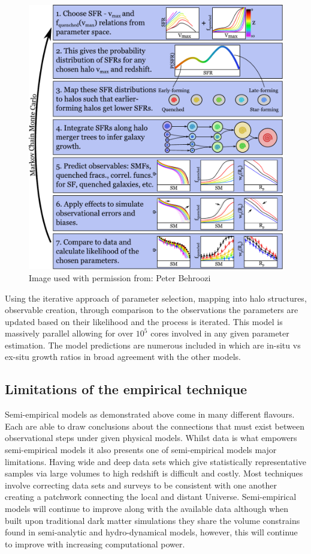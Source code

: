 \begin{figure}[h]
    \centering
    \includegraphics[width = \linewidth]{Figures/Chapter1/sfr_method.pdf}
    \caption{Image used with permission from: Peter Behroozi \cite{Behroozi2019UniverseMachine:010}}
    \label{fig:BehMeth}
\end{figure}


Using the iterative approach of parameter selection, mapping into halo structures, observable creation, through comparison to the observations the parameters are updated based on their likelihood and the process is iterated. This model is massively parallel allowing for over $10^{5}$ cores involved in any given parameter estimation. The model predictions are numerous included in which are in-situ vs ex-situ growth ratios in broad agreement with the other models.

\subsection{Limitations of the empirical technique}
Semi-empirical models as demonstrated above come in many different flavours. Each are able to draw conclusions about the connections that must exist between observational steps under given physical models. Whilst data is what empowers semi-empirical models it also presents one of semi-empirical models major limitations. Having wide and deep data sets which give statistically representative samples via large volumes to high redshift is difficult and costly. Most techniques involve correcting data sets and surveys to be consistent with one another creating a patchwork connecting the local and distant Universe. Semi-empirical models will continue to improve along with the available data although when built upon traditional dark matter simulations they share the volume constrains found in semi-analytic and hydro-dynamical models, however, this will continue to improve with increasing computational power.


